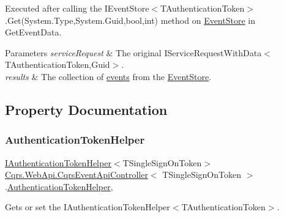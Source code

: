 Executed after calling the I\+Event\+Store$<$\+T\+Authentication\+Token$>$.\+Get(\+System.\+Type,\+System.\+Guid,bool,int) method on \hyperlink{namespaceCqrs_1_1EventStore}{Event\+Store} in Get\+Event\+Data. 


\begin{DoxyParams}{Parameters}
{\em service\+Request} & The original I\+Service\+Request\+With\+Data$<$\+T\+Authentication\+Token,\+Guid$>$.\\
\hline
{\em results} & The collection of \hyperlink{}{events} from the \hyperlink{namespaceCqrs_1_1EventStore}{Event\+Store}.\\
\hline
\end{DoxyParams}


\subsection{Property Documentation}
\mbox{\label{classCqrs_1_1WebApi_1_1CqrsEventApiController_ac5f102242d785de8f366b380a7f54503_ac5f102242d785de8f366b380a7f54503}} 
\subsubsection{\texorpdfstring{Authentication\+Token\+Helper}{AuthenticationTokenHelper}}
{\footnotesize\ttfamily \hyperlink{interfaceCqrs_1_1Authentication_1_1IAuthenticationTokenHelper}{I\+Authentication\+Token\+Helper}$<$T\+Single\+Sign\+On\+Token$>$ \hyperlink{classCqrs_1_1WebApi_1_1CqrsEventApiController}{Cqrs.\+Web\+Api.\+Cqrs\+Event\+Api\+Controller}$<$ T\+Single\+Sign\+On\+Token $>$.\hyperlink{classCqrs_1_1Authentication_1_1AuthenticationTokenHelper}{Authentication\+Token\+Helper}\hspace{0.3cm}{\ttfamily [get]}, {\ttfamily [protected]}}



Gets or set the I\+Authentication\+Token\+Helper$<$\+T\+Authentication\+Token$>$. 

\mbox{\label{classCqrs_1_1WebApi_1_1CqrsEventApiController_a5d008d6964d062848e47f81b104beed6_a5d008d6964d062848e47f81b104beed6}} 
